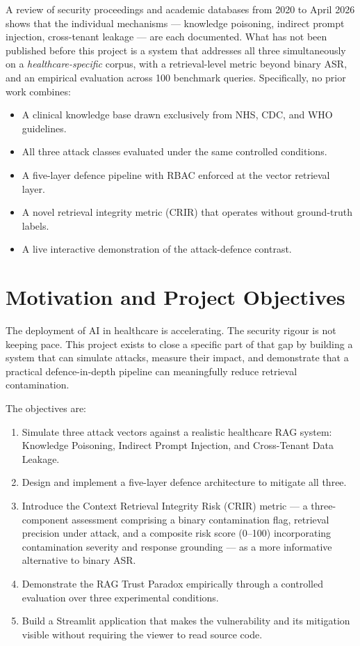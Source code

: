 A review of security proceedings and academic databases from 2020 to April 2026 shows that the individual mechanisms --- knowledge poisoning, indirect prompt injection, cross-tenant leakage --- are each documented. What has not been published before this project is a system that addresses all three simultaneously on a \textit{healthcare-specific} corpus, with a retrieval-level metric beyond binary ASR, and an empirical evaluation across 100 benchmark queries. Specifically, no prior work combines:
\begin{itemize}
    \item A clinical knowledge base drawn exclusively from NHS, CDC, and WHO guidelines.
    \item All three attack classes evaluated under the same controlled conditions.
    \item A five-layer defence pipeline with RBAC enforced at the vector retrieval layer.
    \item A novel retrieval integrity metric (CRIR) that operates without ground-truth labels.
    \item A live interactive demonstration of the attack-defence contrast.
\end{itemize}

\section{Motivation and Project Objectives}

The deployment of AI in healthcare is accelerating. The security rigour is not keeping pace. This project exists to close a specific part of that gap by building a system that can simulate attacks, measure their impact, and demonstrate that a practical defence-in-depth pipeline can meaningfully reduce retrieval contamination.

The objectives are:
\begin{enumerate}
    \item Simulate three attack vectors against a realistic healthcare RAG system: Knowledge Poisoning, Indirect Prompt Injection, and Cross-Tenant Data Leakage.
    \item Design and implement a five-layer defence architecture to mitigate all three.
    \item Introduce the Context Retrieval Integrity Risk (CRIR) metric --- a three-component assessment comprising a binary contamination flag, retrieval precision under attack, and a composite risk score (0--100) incorporating contamination severity and response grounding --- as a more informative alternative to binary ASR.
    \item Demonstrate the RAG Trust Paradox empirically through a controlled evaluation over three experimental conditions.
    \item Build a Streamlit application that makes the vulnerability and its mitigation visible without requiring the viewer to read source code.
\end{enumerate}

